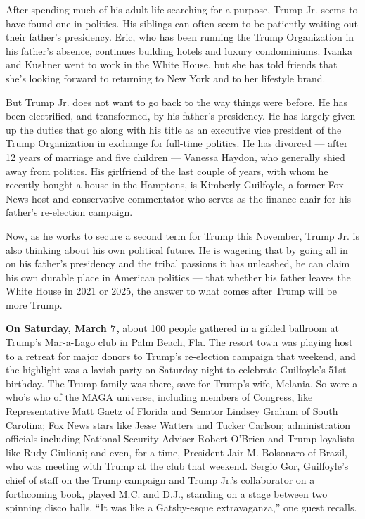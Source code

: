 After spending much of his adult life searching for a purpose, Trump Jr.
seems to have found one in politics. His siblings can often seem to be
patiently waiting out their father's presidency. Eric, who has been
running the Trump Organization in his father's absence, continues
building hotels and luxury condominiums. Ivanka and Kushner went to work
in the White House, but she has told friends that she's looking forward
to returning to New York and to her lifestyle brand.

But Trump Jr. does not want to go back to the way things were before. He
has been electrified, and transformed, by his father's presidency. He
has largely given up the duties that go along with his title as an
executive vice president of the Trump Organization in exchange for
full-time politics. He has divorced --- after 12 years of marriage and
five children --- Vanessa Haydon, who generally shied away from
politics. His girlfriend of the last couple of years, with whom he
recently bought a house in the Hamptons, is Kimberly Guilfoyle, a former
Fox News host and conservative commentator who serves as the finance
chair for his father's re-election campaign.

Now, as he works to secure a second term for Trump this November, Trump
Jr. is also thinking about his own political future. He is wagering that
by going all in on his father's presidency and the tribal passions it
has unleashed, he can claim his own durable place in American politics
--- that whether his father leaves the White House in 2021 or 2025, the
answer to what comes after Trump will be more Trump.

\textbf{On Saturday, March 7,} about 100 people gathered in a gilded
ballroom at Trump's Mar-a-Lago club in Palm Beach, Fla. The resort town
was playing host to a retreat for major donors to Trump's re-election
campaign that weekend, and the highlight was a lavish party on Saturday
night to celebrate Guilfoyle's 51st birthday. The Trump family was
there, save for Trump's wife, Melania. So were a who's who of the MAGA
universe, including members of Congress, like Representative Matt Gaetz
of Florida and Senator Lindsey Graham of South Carolina; Fox News stars
like Jesse Watters and Tucker Carlson; administration officials
including National Security Adviser Robert O'Brien and Trump loyalists
like Rudy Giuliani; and even, for a time, President Jair M. Bolsonaro of
Brazil, who was meeting with Trump at the club that weekend. Sergio Gor,
Guilfoyle's chief of staff on the Trump campaign and Trump Jr.'s
collaborator on a forthcoming book, played M.C. and D.J., standing on a
stage between two spinning disco balls. ``It was like a Gatsby-esque
extravaganza,'' one guest recalls.

